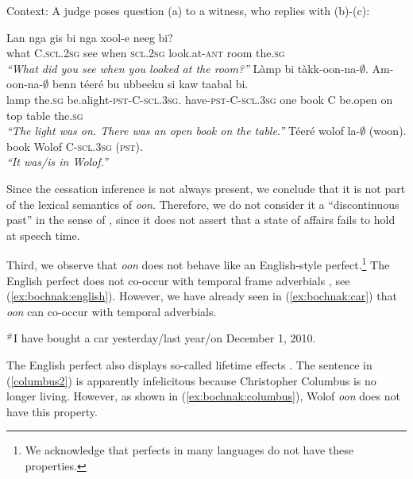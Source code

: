 \documentclass[output=paper,newtxmath,modfonts,nonflat,draftmode]{langsci/langscibook}
\begin{document}
  \begin{exe}
\ex\label{ex:bochnak:wolof1} Context: A judge poses question (a) to a witness, who replies with (b)-(c):
\begin{xlist}
\ex 
\gll Lan nga gis bi nga xool-e neeg bi?\\
what C.\textsc{scl.2sg} see when \textsc{scl.2sg} look.at-\textsc{ant} room the.\textsc{sg}\\
\glt\textit{``What did you see when you looked at the room?''}
\ex
\gll L\`amp bi t\`akk-oon-na-$\emptyset$. Am-oon-na-$\emptyset$ benn t\'eer\'e bu ubbeeku si kaw taabal bi.\\
lamp the.\textsc{sg}
be.alight-\textsc{pst}-C-\textsc{scl.3sg}. have-\textsc{pst}-C-\textsc{scl.3sg}
one book C be.open on top table the.\textsc{sg}\\
\glt\textit{``The light was on. There was an open book on the table.''}
\ex
\gll T\'eer\'e wolof la-$\emptyset$ (woon).\\
book Wolof C-\textsc{scl.3sg} (\textsc{pst}).\\
\glt \textit{``It was/is in Wolof.''}\label{ex:bochnak:wolof2}

\end{xlist}
\end{exe}



Since the cessation inference is not always present, we conclude that it is not part of the lexical semantics of \textit{oon}. Therefore, we do not consider it a ``discontinuous past'' in the sense of \citet{Plungian2006}, since it does not assert that a state of affairs fails to hold at speech time.


Third, we observe that \textit{oon} does not behave like an English-style perfect.\footnote{We acknowledge that perfects in many languages do not have these properties.} The English perfect does not co-occur with temporal frame adverbials \citep{klein92present}, see (\ref{ex:bochnak:english}). However, we have already seen in (\ref{ex:bochnak:car}) that \textit{oon} can co-occur with temporal adverbials.

\ea\label{ex:bochnak:english}
$^{\#}$I have bought a car yesterday/last year/on December 1, 2010.
\z

The English perfect also displays so-called lifetime effects \citep{mccawley71tense}. The sentence in (\ref{columbus2}) is apparently infelicitous because Christopher Columbus is no longer living. However, as shown in (\ref{ex:bochnak:columbus}), Wolof \textit{oon} does not have this property.
\end{document}
